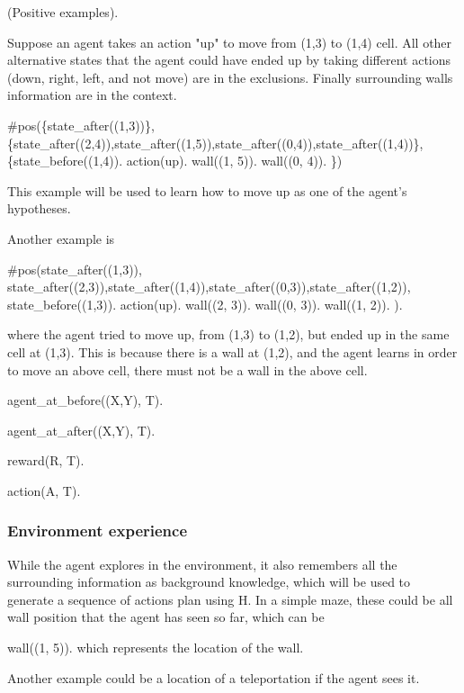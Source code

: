 \begin{examp} \normalfont (Positive examples). 

Suppose an agent takes an action "up" to move from (1,3) to (1,4) cell. All other alternative states that the agent could have ended up by taking different actions 
(down, right, left, and not move) are in the exclusions. Finally surrounding walls information are in the context.

\#pos(\{state\_after((1,3))\}, \\
    \{state\_after((2,4)),state\_after((1,5)),state\_after((0,4)),state\_after((1,4))\}, \\
    \{state\_before((1,4)). action(up). wall((1, 5)). wall((0, 4)). \})



This example will be used to learn how to move up as one of the agent's hypotheses.

Another example is 

\#pos({state\_after((1,3))}, {state\_after((2,3)),state\_after((1,4)),state\_after((0,3)),state\_after((1,2))}, {state\_before((1,3)). action(up). wall((2, 3)). wall((0, 3)). wall((1, 2)). }).

where the agent tried to move up, from (1,3) to (1,2), but ended up in the same cell at (1,3). This is because there is a wall at (1,2), and the agent learns in order to move an above cell,
there must not be a wall in the above cell. 

\end{examp}
\label{state_transition_example}

agent\_at\_before((X,Y), T).

agent\_at\_after((X,Y), T).

reward(R, T).

action(A, T).

\subsubsection{Environment experience}

While the agent explores in the environment, it also remembers all the surrounding information as background knowledge, 
which will be used to generate a sequence of actions plan using H. In a simple maze, these could be all wall position that the agent has seen so far, which can be 

wall((1, 5)). which represents the location of the wall. 

Another example could be a location of a teleportation if the agent sees it. 

